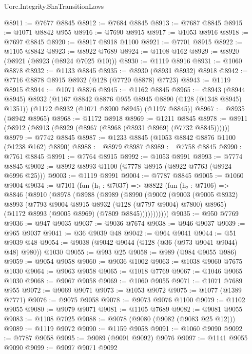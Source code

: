 \begin{lexlean}{Uorc.Integrity.ShaTransitionLaws}
\begin{coremodule}
@8911 := @7677 @8845
@8912 := @7684 @8845
@8913 := @7687 @8845
@8915 := @1071 @8842 @955
@8916 := @7690 @8915
@8917 := @1053 @8916
@8918 := @7697 @8845
@8920 := @8917 @8918 @1100
@8921 := @7701 @8915
@8922 := @1105 @8842
@8923 := @8922 @7689
@8924 := @1108 @162
@8929 := @8920 (@8921 (@8923 (@8924 @7025 @10)))
@8930 := @1119 @8916
@8931 := @1060 @8878
@8932 := @1133 @8845
@8935 := @8930 (@8931 @8932) @8918
@8942 := @7716 @8878 @8915 @8932 (@128 (@7720 @8878) @7723)
@8943 := @1119 @8915
@8944 := @1071 @8876
@8945 := @1162 @8845
@8965 := @8943
    (@8944 @8945)
    @8932
    (@1167 @8842 @8876 @955 @8945 @8890 (@128 (@1348 @8945) @1351))
    (@1172 @8932 (@1071 @8900 @8945) (@1197 @8845))
@8967 := @8935 (@8942 @8965)
@8968 := @1172 @8918
@8969 := @1211 @8845
@8978 := @8911 (@8912 (@8913 (@8929 (@8967 (@8968 (@8931 @8969) (@7732 @8845))))))
@8979 := @7742 @8845
@8987 := @1233 @8845 (@1053 @8842 @8876 @1100 (@1238 @162) @8890)
@8988 := @8979 @8987
@8989 := @7758 @8845
@8990 := @7761 @8845
@8991 := @7764 @8915
@8992 := @1053 @8991
@8993 := @7774 @8845
@9002 := @8992 @8993 @1100 (@7778 @8915 (@8922 @7763 (@8924 @6996 @25)))
@9003 := @1119 @8991
@9004 := @7787 @8845
@9005 := @1060 @9004
@9034 := @7101
    (fun (h₁ : @7037) =>
    @8822
      (fun (h₂ : @7106) =>
      @8846
        (@8910
          (@8978
            (@8988
              (@8989
                (@8990
                  (@9002
                    (@9003
                      (@9005 @8932)
                      @8993
                      (@7793 @9004 @8915 @8932 (@128 (@7797 @9004) @7800) @8965)
                      (@1172 @8993 (@9005 @8969) (@7809 @8845)))))))))))
@9035 := @950 @7769
@9036 := @947 @9035
@9037 := @9036 @7674
@9038 := @946 @9037
@9039 := @965 @9037
@9041 := @36 @9039 @48
@9042 := @964 @9041
@9044 := @51 @9039 @48
@9054 := @9038 (@9042 @9044 (@128 (@36 (@973 @9041 @9044) @48) @980)) @1030
@9055 := @993 @25
@9058 := @989 (@984 @9055 @986)
@9059 := @9054 @9058
@9060 := @9036 @1002
@9063 := @1038 @9060 @7675 @1030
@9064 := @9063 @9058
@9065 := @1018 @7769
@9067 := @1046 @9065 @1030
@9068 := @9067 @9058
@9069 := @1060 @9055
@9071 := @1071 @7689 @955
@9072 := @9069 @9071
@9073 := @1053 @9072
@9075 := @1077 (@1389 @7771)
@9076 := @9075 @9058
@9078 := @9073 @9076 @1100
@9079 := @1102 @9055
@9080 := @9079 @9071
@9081 := @1105 @7689
@9082 := @9081 @9055
@9083 := @1108 @7025
@9088 := @9078 (@9080 (@9082 (@9083 @25 @12)))
@9089 := @1119 @9072
@9090 := @1159 @9058
@9091 := @1060 @9090
@9092 := @7787 @9058
@9095 := @9089 (@9091 @9092) @9076
@9097 := @1141 @9055 @9090
@9099 := @9097 @9071 @9092

\end{coremodule}
\end{lexlean}
